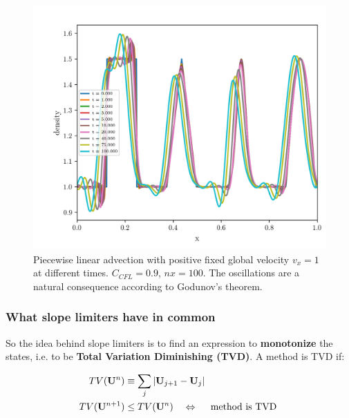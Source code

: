 \begin{figure}
	\centering
	\includegraphics[width=.9\textwidth]{./figures/advection-pwlin-four-shapes.png}%
	\caption{
		\label{fig:advection-pwlin-four-shapes-fixed-positive-vel}
		Piecewise linear advection with positive fixed global velocity $v_x = 1$ at different times. 
		$C_{CFL} = 0.9$,  $nx = 100$.
		The oscillations are a natural consequence according to Godunov's theorem.
	}
\end{figure}

















\subsubsection{What slope limiters have in common}



So the idea behind slope limiters is to find an expression to \textbf{monotonize} the states, i.e. to be \textbf{Total Variation Diminishing (TVD)}.
A method is TVD if:

\begin{align}
	TV(\U^n) &\equiv \sum_j | \U_{j+1} - \U_j | \\
	TV(\U^{n+1}) &\leq TV(\U^n) \quad \Leftrightarrow \quad \text{ method is TVD }
\end{align}





